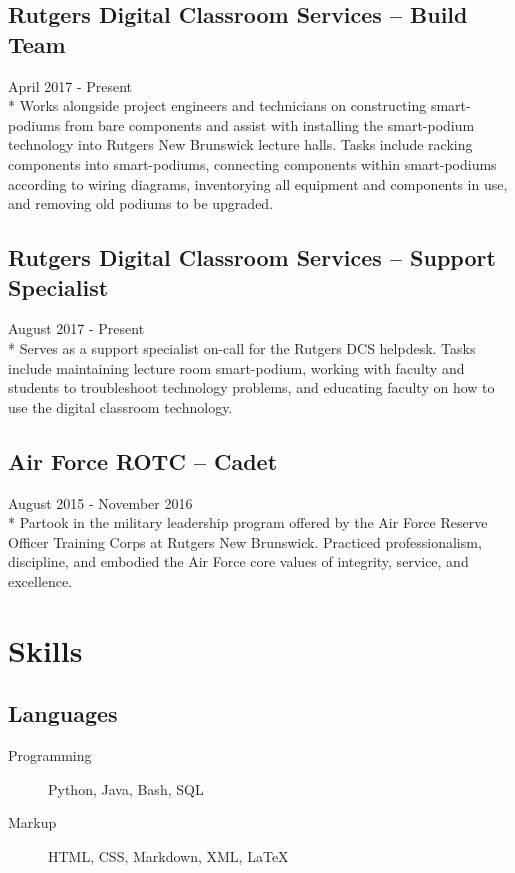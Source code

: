\documentclass{article}
\begin{document}
\begin{samepage}
\subsection{Rutgers Digital Classroom Services -- Build Team}
April 2017 - Present\\*
Works alongside project engineers and technicians on constructing smart-podiums from bare components and assist with installing the smart-podium technology into Rutgers New Brunswick lecture halls. Tasks include racking components into smart-podiums, connecting components within smart-podiums according to wiring diagrams, inventorying all equipment and components in use, and removing old podiums to be upgraded. 

\subsection{Rutgers Digital Classroom Services -- Support Specialist}
August 2017 - Present\\*
Serves as a support specialist on-call for the Rutgers DCS helpdesk. Tasks include maintaining lecture room smart-podium, working with faculty and students to troubleshoot technology problems, and educating faculty on how to use the digital classroom technology.

\subsection{Air Force ROTC -- Cadet}
August 2015 - November 2016\\*
Partook in the military leadership program offered by the Air Force Reserve Officer Training Corps at Rutgers New Brunswick. Practiced professionalism, discipline, and embodied the Air Force core values of integrity, service, and excellence.

\section{Skills}

\iffalse
\subsection{Soft Skills}
Technical Writing/Documentation Writing, Router Configuration, Server Administration, Raspberry Pi, Arduino
\fi

\subsection{Languages}
\begin{description}
\item[Programming] Python, Java, Bash, SQL
\item[Markup] HTML, CSS, Markdown, XML, {\LaTeX}
\end{description}


\end{samepage}
\end{document}
